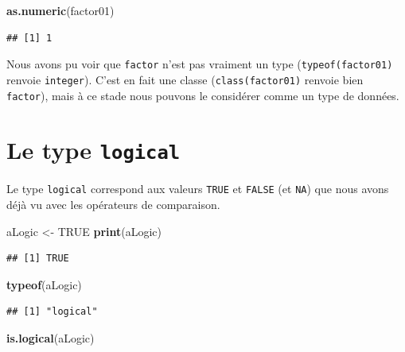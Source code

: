 \documentclass[twoside,symmetric]{book}
\newenvironment{Shaded}{}{}
\newcommand{\KeywordTok}[1]{\textbf{#1}}
\newcommand{\NormalTok}[1]{#1}
\newcommand{\OtherTok}[1]{#1}
\newcommand{\StringTok}[1]{#1}
\begin{document}
\begin{Shaded}
\begin{Highlighting}[]
\KeywordTok{as.numeric}\NormalTok{(factor01)}
\end{Highlighting}
\end{Shaded}

\begin{verbatim}
## [1] 1
\end{verbatim}

Nous avons pu voir que \texttt{factor} n'est pas vraiment un type (\texttt{typeof(factor01)} renvoie \texttt{integer}). C'est en fait une classe (\texttt{class(factor01)} renvoie bien \texttt{factor}), mais à ce stade nous pouvons le considérer comme un type de données.

\hypertarget{l013logi}{%
\section{\texorpdfstring{Le type \texttt{logical}}{Le type logical}}\label{l013logi}}

Le type \texttt{logical} correspond aux valeurs \texttt{TRUE} et \texttt{FALSE} (et \texttt{NA}) que nous avons déjà vu avec les opérateurs de comparaison.

\begin{Shaded}
\begin{Highlighting}[]
\NormalTok{aLogic <-}\StringTok{ }\OtherTok{TRUE}
\KeywordTok{print}\NormalTok{(aLogic)}
\end{Highlighting}
\end{Shaded}

\begin{verbatim}
## [1] TRUE
\end{verbatim}

\begin{Shaded}
\begin{Highlighting}[]
\KeywordTok{typeof}\NormalTok{(aLogic)}
\end{Highlighting}
\end{Shaded}

\begin{verbatim}
## [1] "logical"
\end{verbatim}

\begin{Shaded}
\begin{Highlighting}[]
\KeywordTok{is.logical}\NormalTok{(aLogic)}
\end{Highlighting}
\end{Shaded}
\end{document}
